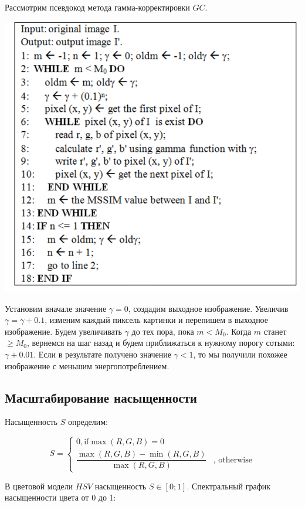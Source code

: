 \documentclass[a4paper, 12pt]{article}
\begin{document}
	Рассмотрим псевдокод метода гамма-корректировки $GC$.
	
	\includegraphics[scale=0.6]{5}
	
	Установим вначале значение $\gamma=0$, создадим выходное изображение. Увеличив $\gamma=\gamma+0.1$, изменим каждый пиксель картинки и перепишем в  выходное изображение. Будем увеличивать $\gamma$ до тех пора, пока $m < M_0$. Когда $m$ станет $\geq M_0$, вернемся на шаг назад и будем приближаться к нужному порогу сотыми: $\gamma+0.01$. Если в результате получено значение $\gamma < 1$, то мы получили похожее изображение с меньшим энергопотреблением. 
	
\subsection*{Масштабирование насыщенности}

    Насыщенность $S$ определим:
    
    \begin{equation*}
     S = 
     \begin{cases}
       0, \text{if} \max{(R, G, B)} = 0\\
       \dfrac{\max{(R, G, B)} - \min{(R, G, B)}}{\max{(R, G, B)}} &\text{, otherwise}
     \end{cases}
    \end{equation*}
    
    В цветовой модели $HSV$ насыщенность $S \in [0;1]$. Спектральный график насыщенности цвета от 0 до 1:
    
\end{document}
